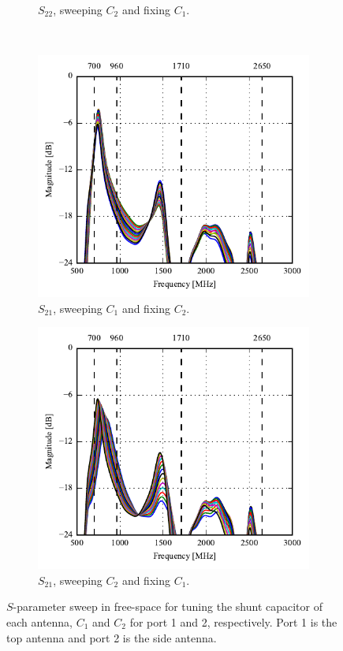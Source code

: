 \begin{figure}[htbp]
\begin{subfigure}[b]{0.49\linewidth}
        \caption{$S_{22}$, sweeping $C_2$ and fixing $C_1$.}
    \end{subfigure}
~
    \begin{subfigure}[b]{0.49\linewidth}
        \centering
        \includegraphics{img/tech_sol/monopole/s21-s11}
        \caption{$S_{21}$, sweeping $C_1$ and fixing $C_2$.}
    \end{subfigure}
    \hfill
    \begin{subfigure}[b]{0.49\linewidth}
        \centering
        \includegraphics{img/tech_sol/monopole/s21-s22}
        \caption{$S_{21}$, sweeping $C_2$ and fixing $C_1$.}
    \end{subfigure}
    \caption{$S$-parameter sweep in free-space for tuning the shunt capacitor of each antenna, $C_1$ and $C_2$ for port 1 and 2, respectively. Port 1 is the top antenna and port 2 is the side antenna.}
    \label{fig:sparam_mono_free_space}
\end{figure}

